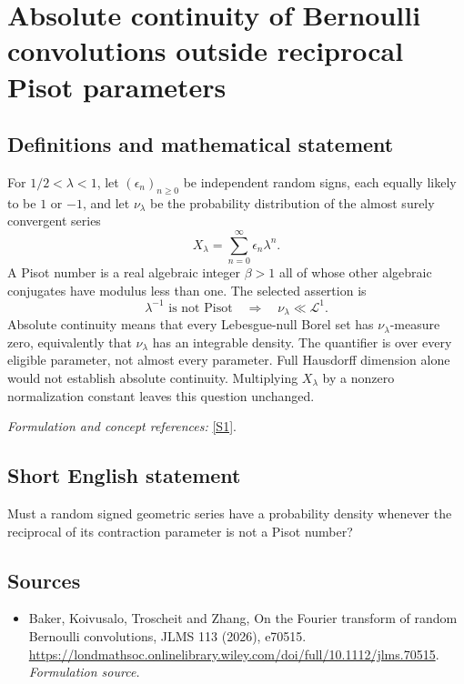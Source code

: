 \documentclass[11pt]{article}
\begin{document}
\section*{\texorpdfstring{Absolute continuity of Bernoulli convolutions outside reciprocal Pisot parameters}{Absolute continuity of Bernoulli convolutions outside reciprocal Pisot parameters}}\label{30006925}
\subsection{Definitions and mathematical statement}
For $1/2<\lambda<1$, let $(\epsilon_n)_{n\ge0}$ be independent random signs, each equally likely to be $1$ or $-1$, and let $\nu_\lambda$ be the probability distribution of the almost surely convergent series
\[
 X_\lambda=\sum_{n=0}^{\infty}\epsilon_n\lambda^n.
\]
A Pisot number is a real algebraic integer $\beta>1$ all of whose other algebraic conjugates have modulus less than one. The selected assertion is
\[
 \lambda^{-1}\text{ is not Pisot}\quad\Longrightarrow\quad
 \nu_\lambda\ll\mathcal L^1.
\]
Absolute continuity means that every Lebesgue-null Borel set has $\nu_\lambda$-measure zero, equivalently that $\nu_\lambda$ has an integrable density. The quantifier is over every eligible parameter, not almost every parameter. Full Hausdorff dimension alone would not establish absolute continuity. Multiplying $X_\lambda$ by a nonzero normalization constant leaves this question unchanged.
\par\smallskip\textit{Formulation and concept references:} \href{https://londmathsoc.onlinelibrary.wiley.com/doi/full/10.1112/jlms.70515}{[S1]}.

\subsection{Short English statement}
Must a random signed geometric series have a probability density whenever the reciprocal of its contraction parameter is not a Pisot number?
\subsection{Sources}
\begin{itemize}
\item[S1]Baker, Koivusalo, Troscheit and Zhang, On the Fourier transform of random Bernoulli convolutions, JLMS 113 (2026), e70515.
\url{https://londmathsoc.onlinelibrary.wiley.com/doi/full/10.1112/jlms.70515}.
\textit{Formulation source.}
\end{itemize}
\end{document}
